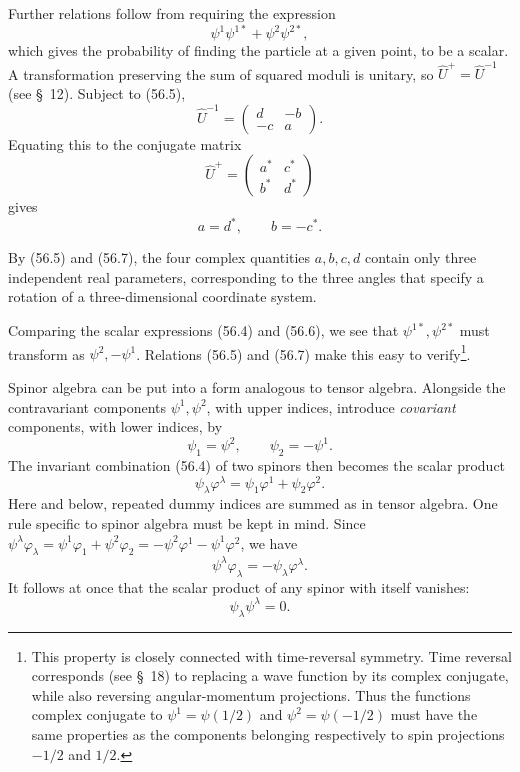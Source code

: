 Further relations follow from requiring the expression
\begin{equation}
 \psi^1\psi^{1*}+\psi^2\psi^{2*},
 \tag{56.6}
\end{equation}
which gives the probability of finding the particle at a given point, to be a
scalar. A transformation preserving the sum of squared moduli is unitary, so
$\hat U^+=\hat U^{-1}$ (see \S~12). Subject to (56.5),
\[
 \hat U^{-1}=\begin{pmatrix}d&-b\\-c&a\end{pmatrix}.
\]
Equating this to the conjugate matrix
\[
 \hat U^+=\begin{pmatrix}a^*&c^*\\b^*&d^*\end{pmatrix}
\]
gives
\begin{equation}
 a=d^*,\qquad b=-c^*.
 \tag{56.7}
\end{equation}

By (56.5) and (56.7), the four complex quantities $a,b,c,d$ contain only
three independent real parameters, corresponding to the three angles that
specify a rotation of a three-dimensional coordinate system.

Comparing the scalar expressions (56.4) and (56.6), we see that
$\psi^{1*},\psi^{2*}$ must transform as $\psi^2,-\psi^1$. Relations (56.5)
and (56.7) make this easy to verify\footnote{This property is closely
connected with time-reversal symmetry. Time reversal corresponds (see
\S~18) to replacing a wave function by its complex conjugate, while also
reversing angular-momentum projections. Thus the functions complex conjugate
to $\psi^1=\psi(1/2)$ and $\psi^2=\psi(-1/2)$ must have the same properties
as the components belonging respectively to spin projections $-1/2$ and
$1/2$.}.

Spinor algebra can be put into a form analogous to tensor algebra. Alongside
the contravariant components $\psi^1,\psi^2$, with upper indices, introduce
\emph{covariant} components, with lower indices, by
\begin{equation}
 \psi_1=\psi^2,\qquad \psi_2=-\psi^1.
 \tag{56.8}
\end{equation}
The invariant combination (56.4) of two spinors then becomes the scalar
product
\begin{equation}
 \psi_\lambda\varphi^\lambda
 =\psi_1\varphi^1+\psi_2\varphi^2.
 \tag{56.9}
\end{equation}
Here and below, repeated dummy indices are summed as in tensor algebra. One
rule specific to spinor algebra must be kept in mind. Since
$\psi^\lambda\varphi_\lambda=\psi^1\varphi_1+\psi^2\varphi_2
=-\psi^2\varphi^1-\psi^1\varphi^2$, we have
\begin{equation}
 \psi^\lambda\varphi_\lambda=-\psi_\lambda\varphi^\lambda.
 \tag{56.10}
\end{equation}
It follows at once that the scalar product of any spinor with itself vanishes:
\begin{equation}
 \psi_\lambda\psi^\lambda=0.
 \tag{56.11}
\end{equation}

